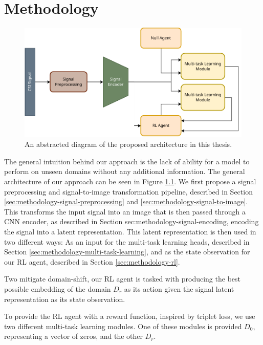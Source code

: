 \chapter{Methodology}\label{chapter:methodology}

\begin{figure}
	\centering
	\includegraphics[width=\linewidth]{figures/arch_diagram.pdf}
	\caption{An abstracted diagram of the proposed architecture in this thesis.}
	\label{fig:arch-diagram}
\end{figure}

The general intuition behind our approach is the lack of ability for a model to perform on unseen domains without any additional information.
The general architecture of our approach can be seen in Figure \ref{fig:arch-diagram}.
We first propose a signal preprocessing and signal-to-image transformation pipeline, described in Section \ref{sec:methodology-signal-preprocessing} and \ref{sec:methodology-signal-to-image}.
This transforms the input signal into an image that is then passed through a CNN encoder, as described in Section {sec:methodology-signal-encoding}, encoding the signal into a latent representation.
This latent representation is then used in two different ways: As an input for the multi-task learning heads, described in Section \ref{sec:methodology-multi-task-learning}, and as the state observation for our RL agent, described in Section \ref{sec:methodology-rl}.

Two mitigate domain-shift, our RL agent is tasked with producing the best possible embedding of the domain $D_{r}$ as its action given the signal latent representation as its state observation.

To provide the RL agent with a reward function, inspired by triplet loss, we use two different multi-task learning modules.
One of these modules is provided $D_{0}$, representing a vector of zeros, and the other $D_{r}$.

